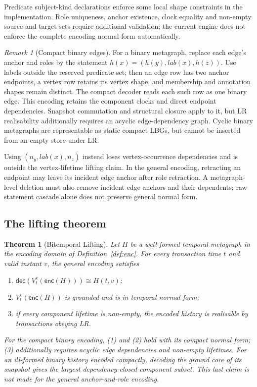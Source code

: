 \documentclass[11pt]{article}
\theoremstyle{plain}
\newtheorem{theorem}{Theorem}
\theoremstyle{definition}
\theoremstyle{remark}
\newtheorem{remark}{Remark}
\newcommand{\View}[2]{V_{#1}^{#2}}
\newcommand{\enc}{\mathsf{enc}}
\newcommand{\dec}{\mathsf{dec}}
\begin{document}
Predicate subject-kind declarations enforce some local shape constraints in the
implementation. Role uniqueness, anchor existence, clock equality and non-empty
source and target sets require additional validation; the current engine does
not enforce the complete encoding normal form automatically.

\begin{remark}[Compact binary edges]\label{rem:binary}
For a binary metagraph, replace each edge's anchor and roles by the statement
$h(x)=(h(y),\mathit{lab}(x),h(z))$. Use labels outside the reserved predicate
set; then an edge row has two anchor endpoints, a vertex row retains its
vertex shape, and membership and annotation shapes remain distinct. The compact
decoder reads each such row as one binary edge. This encoding retains the
component clocks and direct endpoint dependencies. Snapshot commutation and
structural closure apply to it, but LR realisability additionally requires an
acyclic edge-dependency graph. Cyclic binary metagraphs are representable as
static compact LBGs, but cannot be inserted from an empty store under LR.

Using $(n_y,\mathit{lab}(x),n_z)$ instead loses vertex-occurrence dependencies
and is outside the vertex-lifetime lifting claim. In the general encoding,
retracting an endpoint may leave its incident edge anchor after role retraction.
A metagraph-level deletion must also remove incident edge anchors and their
dependents; raw statement cascade alone does not preserve general normal form.
\end{remark}

\subsection{The lifting theorem}

\begin{theorem}[Bitemporal Lifting]\label{thm:lifting}
Let $H$ be a well-formed temporal metagraph in the encoding domain of
Definition~\ref{def:enc}. For every transaction time $t$ and
valid instant $v$, the general encoding satisfies
\begin{enumerate}
\item $\dec(\View{t}{v}(\enc(H)))\cong H(t,v)$;
\item $\View{t}{v}(\enc(H))$ is grounded and is in temporal normal form;
\item if every component lifetime is non-empty, the encoded history is realisable
  by transactions obeying LR.
\end{enumerate}
For the compact binary encoding, (1) and (2) hold with its compact normal form;
(3) additionally requires acyclic edge dependencies and non-empty lifetimes. For an ill-formed binary
history encoded compactly, decoding the ground core of its snapshot gives the
largest dependency-closed component subset. This last claim is not made for
the general anchor-and-role encoding.
\end{theorem}
\end{document}
